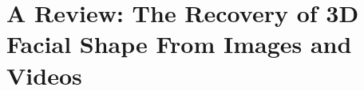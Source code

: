 \chapter{A Review: The Recovery of 3D Facial Shape From Images and Videos}\label{ch:background}
\lipsum[1-3]
